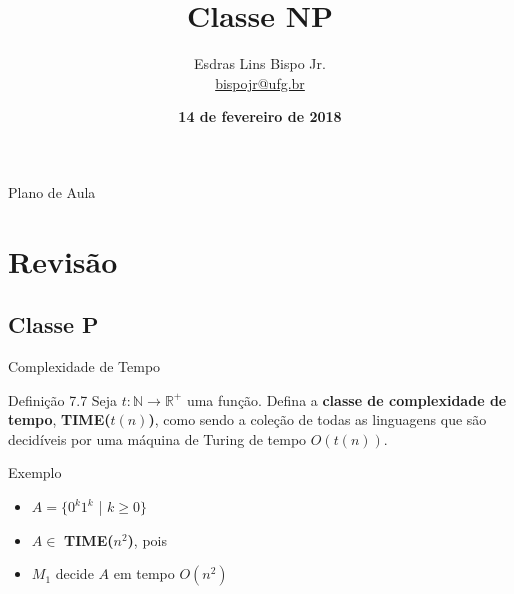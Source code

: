 \documentclass[xcolor=dvipsnames,table]{beamer}
\title{Classe NP}
\author{
  Esdras Lins Bispo Jr. \\ \url{bispojr@ufg.br}
  }
\institute{
  Teoria da Computação \\Bacharelado em Ciência da Computação}
\date{\textbf{14 de fevereiro de 2018} }
\begin{document}
	\begin{frame}
		\titlepage
	\end{frame}

	\AtBeginSection{
		\begin{frame}{Sumário}%
    		\tableofcontents[currentsection]
		\end{frame}
	}

	\begin{frame}{Plano de Aula}
		\tableofcontents
	\end{frame}
    
    \section{Revisão}
	\subsection{Classe P}	
	\begin{frame}{Complexidade de Tempo}
		\begin{block}{Definição 7.7}
			Seja $t: \mathbb{N} \rightarrow \mathbb{R}^+$ uma função. Defina a {\bf classe de complexidade de tempo}, {\bf TIME($t(n)$)}, como sendo a coleção de todas as linguagens que são decidíveis por uma máquina de Turing de tempo $O(t(n))$.
		\end{block}   
		\begin{block}{Exemplo}
			\begin{itemize}
				\item $A = \{ 0^k 1^k$ | $k \geq 0 \}$
				\item $A \in$ {\bf TIME($n^2$)}, pois   
				\item $M_1$ decide $A$ em tempo $O(n^2)$
			\end{itemize}
		\end{block}
	\end{frame}
	
\end{document}
